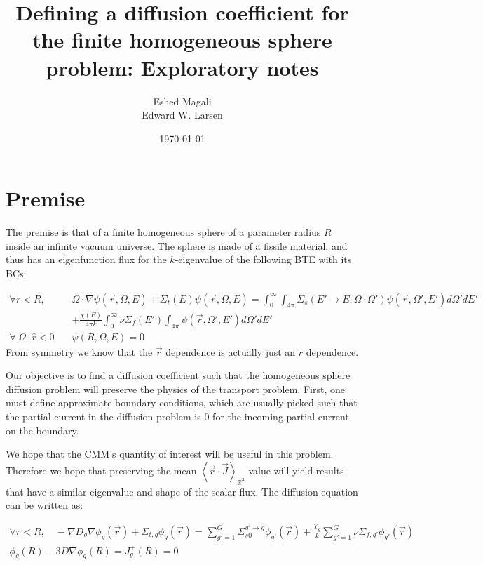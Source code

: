 \documentclass[a4paper,letterpaper,12pt,oneside,draft]{article}
\title{Defining a diffusion coefficient for the finite homogeneous sphere problem: Exploratory notes}
\author{Eshed Magali \\ Edward W. Larsen}
\date{\today}
\newcommand{\allspace}{\ensuremath{\mathbb{R}^3}}
\newcommand{\bracket}[1]{\ensuremath{\left\langle #1 \right\rangle}}
\newcommand{\bracketR}[1]{\ensuremath{\bracket{#1}_{\allspace}}}
\newcommand{\rdotJ}{\bracketR{\vec{r}\cdot\vec{J}}}
\newcommand{\intener}[2][]{\int_0^\infty{#2}dE#1}
\newcommand{\sumener}[2][]{\sum_{g#1=1}^{G}{#2}}
\newcommand{\vr}{\ensuremath{\vec{r}}}
\newcommand{\psif}[1][]{\psi(\vr,\Omega#1,E#1)}
\begin{document}
\maketitle

\section{Premise}
    The premise is that of a finite homogeneous sphere of a parameter radius $R$ inside an infinite vacuum universe. The sphere is made of a fissile material, and thus has an eigenfunction flux for the $k$-eigenvalue of the following BTE with its BCs:
    
    \begin{align}
        \label{eq:BTE}
        \forall r<R,\quad & \Omega\cdot\nabla\psif + \Sigma_t(E)\psif = \intener[']{\int_{4\pi}\Sigma_{s}(E'\to E,\Omega\cdot\Omega')\psif[']d\Omega'} \\ \nonumber
        & + \frac{\chi(E)}{4\pi k}\intener[']{\nu\Sigma_f(E')\int_{4\pi}\psif[']d\Omega'} \\
        \label{eq:BTE:BC}
        \forall\  \Omega\cdot\hat{r}<0 \quad &
        \psi(R,\Omega,E) = 0
    \end{align}
    From symmetry we know that the $\vr$ dependence is actually just an $r$ dependence.
    
    Our objective is to find a diffusion coefficient such that the homogeneous sphere diffusion problem will preserve the physics of the transport problem. 
    First, one must define approximate boundary conditions, which are usually picked such that the partial current in the diffusion problem is 0 for the incoming partial current on the boundary.
    
    We hope that the CMM's quantity of interest will be useful in this problem. 
    Therefore we hope that preserving the mean $\rdotJ$ value will yield results that have a similar eigenvalue and shape of the scalar flux. 
    The diffusion equation can be written as:
    
    \begin{gather}
        \label{eq:Diff}
        \forall r<R, \quad-\nabla D_g\nabla\phi_g(\vr) + \Sigma_{t,g}\phi_g(\vr) = \sumener[']{\Sigma_{s0}^{g'\to g}\phi_{g'}(\vr)} + \frac{\chi_g}{k}\sumener[']{\nu\Sigma_{f,g'}\phi_{g'}(\vr)} \\
        \label{eq:Diff:BC}
        \phi_g(R) - 3D\nabla\phi_g(R) = J^+_g(R) = 0
    \end{gather}
    
\end{document}

